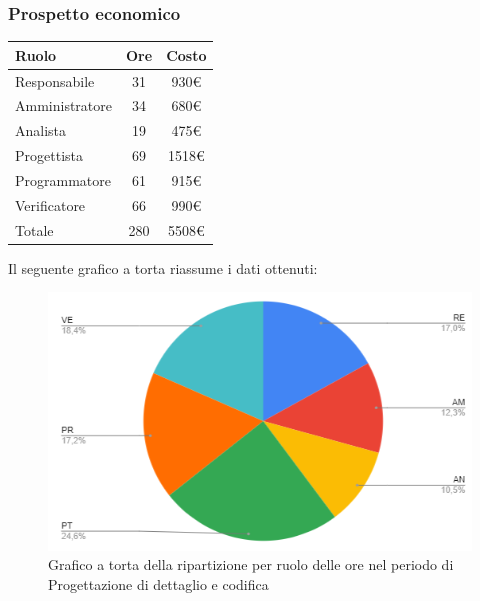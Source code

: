 {{{{{{{{\subsubsection{Prospetto economico}\label{PreventivoFaseDiProgettazioneDiDettaglioECodificaProspettoEconomicoPeriodo1}
\quad
\def\tabularxcolumn#1{m{#1}}
{
	\begin{center}
		\renewcommand{\arraystretch}{1.4}
		\begin{tabularx}{7cm}{|X|c|c|}
			\hline
			\rowcolor{airforceblue}
			\textbf{Ruolo} & \textbf{Ore} & \textbf{Costo}\\
			\hline
			Responsabile & 31 & 930\euro\\
			\hline
			Amministratore & 34 & 680\euro\\
			\hline
			Analista & 19 & 475\euro\\
			\hline
			Progettista & 69 & 1518\euro\\
			\hline
			Programmatore & 61 & 915\euro\\
			\hline
			Verificatore & 66 & 990\euro\\
			\hline
			Totale & 280 & 5508\euro\\
			\hline
		\end{tabularx}
	\end{center}

Il seguente grafico a torta riassume i dati ottenuti:
\begin{figure}[!ht]
	\begin{center}
		\includegraphics[width=0.8\linewidth]{../immagini/pdp/torta_progettazione_dettaglio.png}
		\caption{Grafico a torta della ripartizione per ruolo delle ore nel periodo di Progettazione
			di dettaglio e codifica}
	\end{center}
\end{figure}

}}}}}}}}}
